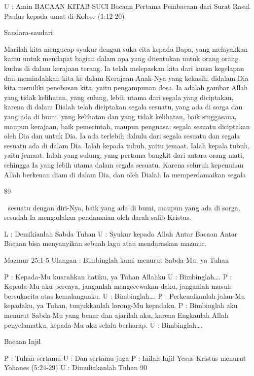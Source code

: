 U : Amin 
BACAAN KITAB SUCI 
Bacaan Pertama 
Pembacaan dari Surat Rasul Paulus kepada umat di Kolese 
(1:12-20) 

Saudara-saudari 

Marilah kita mengucap syukur dengan suka cita kepada 
Bapa, yang melayakkan kamu untuk mendapat bagian dalam 
apa yang ditentukan untuk orang orang kudus di dalam kerajaan 
terang. Ia telah melepaskan kita dari kuasa kegelapan dan 
memindahkan kita ke dalam Kerajaan Anak-Nya yang kekasih; 
didalam Dia kita memiliki penebusan kita, yaitu pengampunan 
dosa. Ia adalah gambar Allah yang tidak kelihatan, yang 
sulung, lebih utama dari segala yang diciptakan, karena di 
dalam Dialah telah diciptakan segala sesuatu, yang ada di sorga 
dan yang ada di bumi, yang kelihatan dan yang tidak kelihatan, 
baik singgasana, maupun kerajaan, baik pemerintah, maupun 
penguasa; segala sesuatu diciptakan oleh Dia dan untuk Dia. Ia 
ada terlebih dahulu dari segala sesuatu dan segala sesuatu ada 
di dalam Dia. Ialah kepada tubuh, yaitu jemaat. Ialah kepala 
tubuh, yaitu jemaat. Ialah yang sulung, yang pertama bangkit 
dari antara orang mati, sehingga Ia yang lebih utama dalam 
segala sesuatu. Karena seluruh kepenuhan Allah berkenan diam 
di dalam Dia, dan oleh Dialah Ia memperdamaikan segala 

89 



sesuatu dengan diri-Nya, baik yang ada di bumi, maupun yang 
ada di sorga, sesudah Ia mengadakan pendamaian oleh darah 
salib Kristus. 

L : Demikianlah Sabda Tuhan 
U : Syukur kepada Allah 
Antar Bacaan 
Antar Bacaan bisa menyanyikan sebuah lagu atau mendaraskan 
mazmur. 

Mazmur 25:1-5 
Ulangan : Bimbinglah kami menurut Sabda-Mu, ya Tuhan 

P : Kepada-Mu kuarahkan hatiku, ya Tuhan Allahku 
U : Bimbinglah…. 
P 
: Kepada-Mu aku percaya, janganlah mengecewakan daku, 
janganlah musuh bersukacita atas kemalanganku. 
U : Bimbinglah…. 
P : Perkenalkanlah jalan-Mu kepadaku, ya Tuhan, 
tunjukkanlah lorong-Mu kepadaku. 
P : Bimbinglah aku menurut Sabda-Mu yang benar dan 
ajarilah aku, karena Engkaulah Allah penyelamatku, 
kepada-Mu aku selalu berharap. 
U : Bimbinglah…. 

Bacaan Injil 

P : Tuhan sertamu 
U : Dan sertamu juga 
P : Inilah Injil Yesus Kristus menurut Yohanes (5:24-29) 
U : Dimuliakanlah Tuhan 
90 


